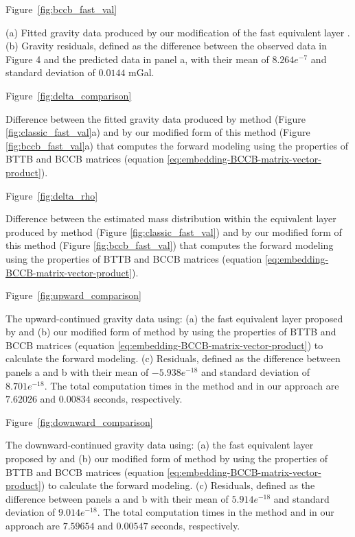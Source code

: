 \documentclass[manuscript,revised]{geophysics}
\begin{document}
Figure~\ref{fig:bccb_fast_val}

{(a) Fitted gravity data produced by our modification of the fast equivalent layer \citep{siqueira-etal2017}. (b) Gravity residuals, defined as the difference between the observed data in Figure 4 and the predicted data in panel a, with their mean of $8.264e^{-7}$ and standard deviation of $0.0144$ mGal.}
\newpage

Figure~\ref{fig:delta_comparison}

{Difference between the fitted gravity data produced by \citet{siqueira-etal2017} method (Figure \ref{fig:classic_fast_val}a) and by our modified form of this method (Figure \ref{fig:bccb_fast_val}a) that computes the forward modeling using the properties of BTTB and BCCB matrices (equation \ref{eq:embedding-BCCB-matrix-vector-product}).}
\newpage

Figure~\ref{fig:delta_rho}

{Difference between the estimated mass distribution within the equivalent layer produced by \citet{siqueira-etal2017} method (Figure \ref{fig:classic_fast_val}) and by our modified form of this method (Figure \ref{fig:bccb_fast_val}) that computes the forward modeling using the properties of BTTB and BCCB matrices (equation \ref{eq:embedding-BCCB-matrix-vector-product}).}
\newpage

Figure~\ref{fig:upward_comparison}

{The upward-continued gravity data using: (a) the fast equivalent layer proposed by \citet{siqueira-etal2017} and (b) our modified form of \citet{siqueira-etal2017} method by using the properties of BTTB and BCCB matrices (equation \ref{eq:embedding-BCCB-matrix-vector-product}) to calculate the forward modeling.  (c) Residuals, defined as the difference between panels a and b with their mean of $-5.938e^{-18}$ and standard deviation of $8.701e^{-18}$.  The total computation times in the \citet{siqueira-etal2017} method and in our approach are $7.62026$ and $0.00834$ seconds, respectively.}
\newpage

Figure~\ref{fig:downward_comparison}

{The downward-continued gravity data using: (a) the fast equivalent layer proposed by \citet{siqueira-etal2017} and (b) our modified form of \citet{siqueira-etal2017} method by using the properties of BTTB and BCCB matrices (equation \ref{eq:embedding-BCCB-matrix-vector-product}) to calculate the forward modeling.  (c) Residuals, defined as the difference between panels a and b with their mean of $5.914e^{-18}$ and standard deviation of $9.014e^{-18}$.  The total computation times in the \citet{siqueira-etal2017} method and in our approach are $7.59654$ and $0.00547$ seconds, respectively.}
\newpage
\end{document}
